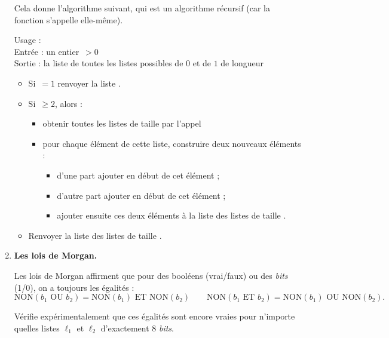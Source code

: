\documentclass[11pt,class=report,crop=false]{standalone}
\begin{document}
\begin{activite}
\begin{enumerate}
  Cela donne l'algorithme suivant, qui est un algorithme récursif (car la fonction s'appelle elle-même).
  \begin{algorithme}
  Usage : \\
  Entrée : un entier \,$>0$\\
  Sortie : la liste de toutes les listes possibles de $0$ et de $1$ de longueur 

  \begin{itemize}
    \item  Si \,$=1$ renvoyer la liste  \ci{[ [0], [1] ]}.     
    \item  Si \,$\ge2$, alors :
    \begin{itemize}
      \item obtenir toutes les listes de taille  par l'appel 
      \item pour chaque élément de cette liste, construire deux nouveaux éléments :
       \begin{itemize} 
         \item d'une part ajouter  en début de cet élément ;
         \item d'autre part ajouter  en début de cet élément ;
         \item ajouter ensuite ces deux éléments à la liste des listes de taille .
       \end{itemize}      
    \end{itemize}
    
    \item Renvoyer la liste des listes de taille .
  \end{itemize}     
 \end{algorithme}  
  
    \item \textbf{Les lois de Morgan.} 
    
    Les lois de Morgan affirment que pour des booléens (vrai/faux) ou des \emph{bits} (1/0), on a toujours les égalités :
    $$\text{NON}( b_1 \text{ OU } b_2 ) = 
    \text{NON}( b_1 )  \text{ ET } \text{NON}(b_2)
    \qquad
    \text{NON}( b_1 \text{ ET } b_2 ) = 
    \text{NON}( b_1 )  \text{ OU } \text{NON}(b_2).$$
    
    Vérifie expérimentalement que ces égalités sont encore vraies pour n'importe quelles listes $\ell_1$ et $\ell_2$ d'exactement $8$ \emph{bits}.
    
\end{enumerate}

\end{activite}
\end{document}
